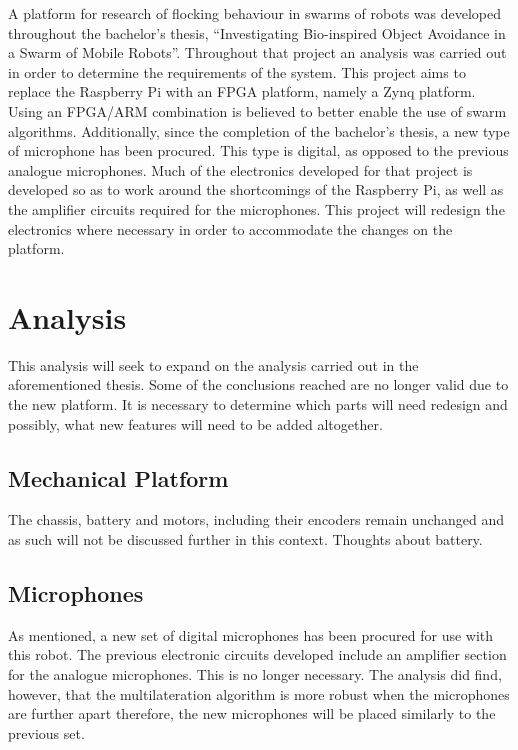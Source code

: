 A platform for research of flocking behaviour in swarms of robots was developed throughout the bachelor's thesis, ``Investigating Bio-inspired Object Avoidance in a Swarm of Mobile Robots''.
Throughout that project an analysis was carried out in order to determine the requirements of the system.
This project aims to replace the Raspberry Pi with an FPGA platform, namely a Zynq platform.
Using an FPGA/ARM combination is believed to better enable the use of swarm algorithms.
Additionally, since the completion of the bachelor's thesis, a new type of microphone has been procured.
This type is digital, as opposed to the previous analogue microphones.
Much of the electronics developed for that project is developed so as to work around the shortcomings of the Raspberry Pi, as well as the amplifier circuits required for the microphones.
This project will redesign the electronics where necessary in order to accommodate the changes on the platform.

\section{Analysis} %
\label{sec:analysis}
This analysis will seek to expand on the analysis carried out in the aforementioned thesis.
Some of the conclusions reached are no longer valid due to the new platform.
It is necessary to determine which parts will need redesign and possibly, what new features will need to be added altogether.

\subsection{Mechanical Platform} %
\label{sub:mechanical_platform}
The chassis, battery and motors, including their encoders remain unchanged and as such will not be discussed further in this context.
Thoughts about battery.

\subsection{Microphones} %
\label{sub:microphones}
As mentioned, a new set of digital microphones has been procured for use with this robot.
The previous electronic circuits developed include an amplifier section for the analogue microphones.
This is no longer necessary.
The analysis did find, however, that the multilateration algorithm is more robust when the microphones are further apart therefore, the new microphones will be placed similarly to the previous set.

